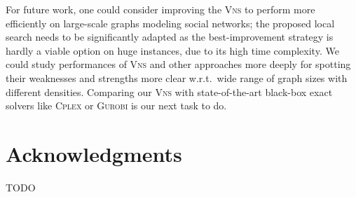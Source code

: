 \documentclass[dvipsnames,format=sigconf,anonymous=true,review=true]{acmart}
\begin{document}
 For future work, one could consider improving the \textsc{Vns} to perform more efficiently on large-scale graphs modeling social networks; the proposed local search needs to be significantly adapted as the best-improvement strategy is hardly a viable option on huge instances, due to  its high time complexity.  We could study performances of \textsc{Vns} and other approaches more deeply for spotting their weaknesses and strengths more clear w.r.t.\  wide range of graph sizes with different densities. Comparing our \textsc{Vns} with state-of-the-art black-box exact solvers like \textsc{Cplex} or \textsc{Gurobi} is our next task to do. 
  
\section*{Acknowledgments} 
TODO



 
\end{document}
